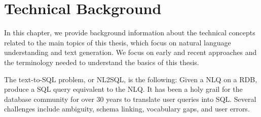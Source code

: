 \section{Technical Background}

In this chapter, we provide background information about the technical concepts related to the main topics of this thesis, which focus on natural language understanding and text generation. We focus on early and recent approaches and the terminology needed to understand the basics of this thesis.

The text-to-SQL problem, or \ac{NL2SQL}, is the following: Given a \ac{NLQ} on a \ac{RDB}, produce a SQL query equivalent to the NLQ. It has been a holy grail for the database community for over 30 years to translate user queries into SQL. Several challenges include ambiguity, schema linking, vocabulary gaps, and user errors.








